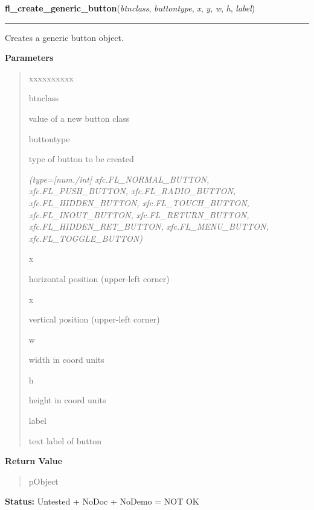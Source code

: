 \hspace{.8\funcindent}\begin{boxedminipage}{\funcwidth}

    \raggedright \textbf{fl\_create\_generic\_button}(\textit{btnclass}, \textit{buttontype}, \textit{x}, \textit{y}, \textit{w}, \textit{h}, \textit{label})

    \vspace{-1.5ex}

    \rule{\textwidth}{0.5\fboxrule}
\setlength{\parskip}{2ex}
    Creates a generic button object.

\setlength{\parskip}{1ex}
      \textbf{Parameters}
      \vspace{-1ex}

      \begin{quote}
        \begin{Ventry}{xxxxxxxxxx}

          \item[btnclass]

          value of a new button class

          \item[buttontype]

          type of button to be created

            {\it (type=[num./int] xfc.FL\_NORMAL\_BUTTON, xfc.FL\_PUSH\_BUTTON, 
xfc.FL\_RADIO\_BUTTON, xfc.FL\_HIDDEN\_BUTTON, xfc.FL\_TOUCH\_BUTTON, 
xfc.FL\_INOUT\_BUTTON, xfc.FL\_RETURN\_BUTTON, xfc.FL\_HIDDEN\_RET\_BUTTON,
xfc.FL\_MENU\_BUTTON, xfc.FL\_TOGGLE\_BUTTON)}

          \item[x]

          horizontal position (upper-left corner)

          \item[x]

          vertical position (upper-left corner)

          \item[w]

          width in coord units

          \item[h]

          height in coord units

          \item[label]

          text label of button

        \end{Ventry}

      \end{quote}

      \textbf{Return Value}
    \vspace{-1ex}

      \begin{quote}
      pObject

      \end{quote}

\textbf{Status:} Untested + NoDoc + NoDemo = NOT OK



    \end{boxedminipage}

